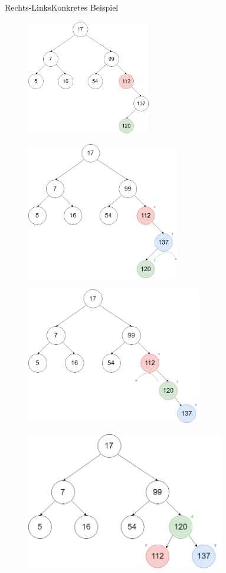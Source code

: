 \begin{frame}[allowframebreaks]{Rechts-Links}{Konkretes Beispiel}
\begin{figure}
	\centering
	\includegraphics[height=5cm]{graph/avl_insert_rl_1}
\end{figure}
\framebreak
\begin{figure}
	\centering
	\includegraphics[height=6cm]{graph/avl_insert_rl_2}
\end{figure}
\framebreak
\begin{figure}
	\centering
	\includegraphics[height=6cm]{graph/avl_insert_rl_3}
\end{figure}
\framebreak
\begin{figure}
	\centering
	\includegraphics[height=6cm]{graph/avl_insert_rl_4}
\end{figure}

\end{frame}